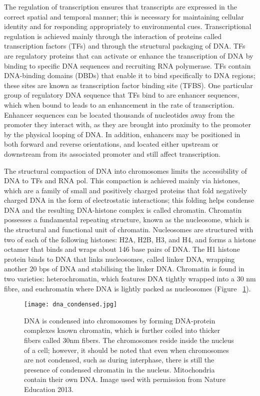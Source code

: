 The regulation of transcription ensures that transcripts are expressed in the correct spatial and temporal manner; this is necessary for maintaining cellular identity and for responding appropriately to environmental cues. Transcriptional regulation is achieved mainly through the interaction of proteins called transcription factors (TFs) and through the structural packaging of DNA. TFs are regulatory proteins that can activate or enhance the transcription of DNA by binding to specific DNA sequences and recruiting RNA polymerase\cite{pmid11092823}. TFs contain DNA-binding domains (DBDs) that enable it to bind specifically to DNA regions; these sites are known as transcription factor binding site (TFBS). One particular group of regulatory DNA sequence that TFs bind to are enhancer sequences, which when bound to leads to an enhancement in the rate of transcription. Enhancer sequences can be located thousands of nucleotides away from the promoter they interact with, as they are brought into proximity to the promoter by the physical looping of DNA. In addition, enhancers may be positioned in both forward and reverse orientations, and located either upstream or downstream from its associated promoter and still affect transcription.

The structural compaction of DNA into chromosomes limits the accessibility of DNA to TFs and RNA pol. This compaction is achieved mainly via histones, which are a family of small and positively charged proteins that fold negatively charged DNA in the form of electrostatic interactions; this folding helps condense DNA and the resulting DNA-histone complex is called chromatin. Chromatin possesses a fundamental repeating structure\cite{holde01111974}, known as the nucleosome, which is the structural and functional unit of chromatin. Nucleosomes are structured with two of each of the following histones: H2A, H2B, H3, and H4, and forms a histone octamer that binds and wraps about 146 base pairs of DNA. The H1 histone protein binds to DNA that links nucleosomes, called linker DNA, wrapping another 20 bps of DNA and stabilising the linker DNA. Chromatin is found in two varieties: heterochromatin, which features DNA tightly wrapped into a 30 nm fibre, and euchromatin where DNA is lightly packed as nucleosomes (Figure ~\ref{fig:dna_condensed}). 

\begin{figure}[!ht]
   \centering
   \texttt{[image: dna\_condensed.jpg]}
   \caption[DNA packaging]{DNA is condensed into chromosomes by forming DNA-protein complexes known chromatin, which is further coiled into thicker fibers called 30nm fibers. The chromosomes reside inside the nucleus of a cell; however, it should be noted that even when chromosomes are not condensed, such as during interphase, there is still the presence of condensed chromatin in the nucleus. Mitochondria contain their own DNA. Image used with permission from Nature Education 2013.}
   \label{fig:dna_condensed}
\end{figure}

